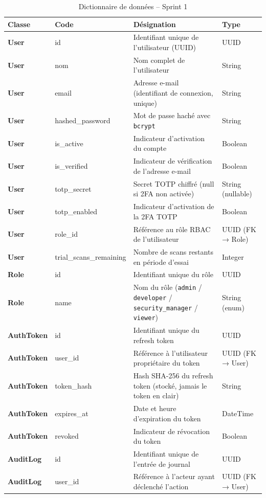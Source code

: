 \begin{table}[H]
\centering
\caption{Dictionnaire de données -- Sprint 1}
\label{tab:dict-sprint1}
\small
\renewcommand{\arraystretch}{1.3}
\begin{tabularx}{\textwidth}{>{\bfseries}p{2.5cm} p{3cm} X p{2.5cm}}
\hline
\rowcolor{gray!15}
\textbf{Classe} & \textbf{Code} & \textbf{Désignation} & \textbf{Type} \\
\hline
User & id & Identifiant unique de l'utilisateur (UUID) & UUID \\
User & nom & Nom complet de l'utilisateur & String \\
User & email & Adresse e-mail (identifiant de connexion, unique) & String \\
User & hashed\_password & Mot de passe haché avec \texttt{bcrypt} & String \\
User & is\_active & Indicateur d'activation du compte & Boolean \\
User & is\_verified & Indicateur de vérification de l'adresse e-mail & Boolean \\
User & totp\_secret & Secret TOTP chiffré (null si 2FA non activée) & String (nullable) \\
User & totp\_enabled & Indicateur d'activation de la 2FA TOTP & Boolean \\
User & role\_id & Référence au rôle RBAC de l'utilisateur & UUID (FK → Role) \\
User & trial\_scans\_remaining & Nombre de scans restants en période d'essai & Integer \\
\hline
Role & id & Identifiant unique du rôle & UUID \\
Role & name & Nom du rôle (\texttt{admin} / \texttt{developer} / \texttt{security\_manager} / \texttt{viewer}) & String (enum) \\
\hline
AuthToken & id & Identifiant unique du refresh token & UUID \\
AuthToken & user\_id & Référence à l'utilisateur propriétaire du token & UUID (FK → User) \\
AuthToken & token\_hash & Hash SHA-256 du refresh token (stocké, jamais le token en clair) & String \\
AuthToken & expires\_at & Date et heure d'expiration du token & DateTime \\
AuthToken & revoked & Indicateur de révocation du token & Boolean \\
\hline
AuditLog & id & Identifiant unique de l'entrée de journal & UUID \\
AuditLog & user\_id & Référence à l'acteur ayant déclenché l'action & UUID (FK → User) \\

\end{tabularx}
\end{table}
